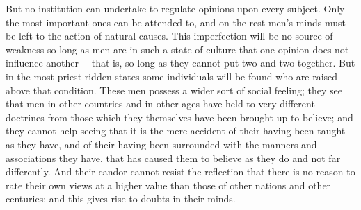 \documentclass[]{article}
\begin{document}
But no institution can undertake to regulate opinions upon every subject. Only the most important ones can be attended to, and on the rest men's minds must be left to the action of natural causes. This imperfection will be no source of weakness so long as men are in such a state of culture that one opinion does not influence another--- that is, so long as they cannot put two and two together. But in the most priest-ridden states some individuals will be found who are raised above that condition. These men possess a wider sort of social feeling; they see that men in other countries and in other ages have held to very different doctrines from those which they themselves have been brought up to believe; and they cannot help seeing that it is the mere accident of their having been taught as they have, and of their having been surrounded with the manners and associations they have, that has caused them to believe as they do and not far differently. And their candor cannot resist the reflection that there is no reason to rate their own views at a higher value than those of other nations and other centuries; and this gives rise to doubts in their minds.
\end{document}
